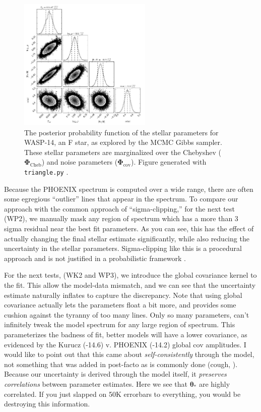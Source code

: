 \documentclass[iop,floatfix]{emulateapj}
\newcommand{\vt}{ {\bm \theta}}
\newcommand{\vP}{ {\bm \Phi}}
\newcommand{\Cheb}{ \vP_{\textrm{Cheb}}}
\newcommand{\Cov}{ \vP_{\textrm{cov}}}
\begin{document}
\begin{figure}[!htb]
\begin{center}
  \includegraphics[draft, width=2.5in]{figs/stellar_triangle_Kurucz.png}
  \caption{The posterior probability function of the stellar parameters for WASP-14, an F star, as explored by the MCMC Gibbs sampler. These stellar parameters are marginalized over the Chebyshev ($\Cheb$) and noise parameters ($\Cov$). Figure generated with \texttt{triangle.py} \citep{foreman-mackey14}.
}
\label{fig:stellar_posterior}
\end{center}
\end{figure}

Because the PHOENIX spectrum is computed over a wide range, there are often some egregious ``outlier'' lines that appear in the spectrum. To compare our approach with the common approach of ``sigma-clipping,'' for the next test (WP2), we manually mask any region of spectrum which has a more than 3 sigma residual near the best fit parameters. As you can see, this has the effect of actually changing the final stellar estimate significantly, while also reducing the uncertainty in the stellar parameters. Sigma-clipping like this is a procedural approach and is not justified in a probabilistic framework \citep{hogg10}.

For the next tests, (WK2 and WP3), we introduce the global covariance kernel to the fit. This allow the model-data mismatch, and we can see that the uncertainty estimate naturally inflates to capture the discrepancy. 
Note that using global covariance actually lets the parameters float a bit more, and provides some cushion against the tyranny of too many lines. Only so many parameters, can't infinitely tweak the model spectrum for any large region of spectrum. This parameterizes the badness of fit, better models will have a lower covariance, as evidenced by the Kurucz (-14.6) v. PHOENIX (-14.2) global cov amplitudes.
I would like to point out that this came about \emph{self-consistently} through the model, not something that was added in post-facto as is commonly done (cough, \citep{torres12, buchhave12}). Because our uncertainty is derived through the model itself, it \emph{preserves correlations} between parameter estimates. Here we see that $\vt_\ast$ are highly correlated. If you just slapped on 50K errorbars to everything, you would be destroying this information.
\end{document}
